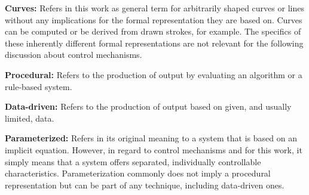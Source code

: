 \textbf{Curves:} Refers in this work as general term for arbitrarily shaped curves or lines without any implications for the formal representation they are based on. Curves can be computed or be derived from drawn strokes, for example. The specifics of these inherently different formal representations are not relevant for the following discussion about control mechanisms.

\textbf{Procedural:} Refers to the production of output by evaluating an algorithm or a rule-based system.

\textbf{Data-driven:} Refers to the production of output based on given, and usually limited, data.

\textbf{Parameterized:} Refers in its original meaning to a system that is based on an implicit equation. However, in regard to control mechanisms and for this work, it simply means that a system offers separated, individually controllable characteristics. Parameterization commonly does not imply a procedural representation but can be part of any technique, including data-driven ones.


